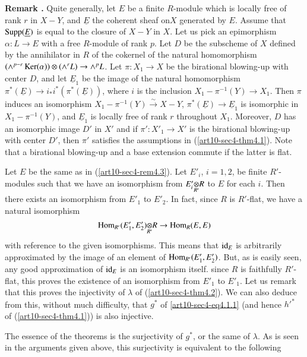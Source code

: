 \medskip
\noindent
{\bf Remark .\label{art10-sec4-rem4.3}}
Quite generally, let $E$ be a finite $R$-module which is locally free of rank $r$ in $X-Y$, and $\underline{E}$ the coherent sheaf on\pageoriginale $X$ generated by $E$. Assume that $\operatorname{\mathrm{Supp}}(\underline{E})$ is equal to the closure of $X-Y$ in $X$. Let us pick an epimorphism $\alpha:L\to E$ with a free $R$-module of rank $p$. Let $D$ be the subscheme of $X$ defined by the annihilator in $R$ of the cokernel of the natural homomorphism $(\wedge^{p-r}\operatorname{\mathrm{Ker}}(\alpha))\otimes (\wedge {}^{r}L)\to \wedge {}^{p}L$. Let $\pi:X_{1}\to X$ be the birational blowing-up with center $D$, and let $\underline{E}_{1}$ be the image of the natural homomorphism $\pi^{*}(\underline{E})\to i_{*}i^{*}(\pi^{*}(\underline{E}))$, where $i$ is the inclusion $X_{1}-\pi^{-1}(Y)\to X_{1}$. Then $\pi$ induces an isomorphism $X_{1}-\pi^{-1}(Y)\xrightarrow{\sim}X-Y$, $\pi^{*}(\underline{E})\to \underline{E}_{1}$ is isomorphic in $X_{1}-\pi^{-1}(Y)$, and $\underline{E}_{1}$ is locally free of rank $r$ throughout $X_{1}$. Moreover, $D$ has an isomorphic image $D'$ in $X'$ and if $\pi':X'_{1}\to X'$ is the birational blowing-up with center $D'$, then $\pi'$ satisfies the assumptions in (\ref{art10-sec4-thm4.1}). Note that a birational blowing-up and a base extension commute if the latter is flat.
\smallskip

Let $E$ be the same as in (\ref{art10-sec4-rem4.3}). Let $E'_{i}$, $i=1,2$, be finite $R'$-modules such that we have an isomorphism from $\foprod{E'_{i}}{R}{R'}$ to $E$ for each $i$. Then there exists an isomorphism from $E'_{1}$ to $E'_{2}$. In fact, since $R$ is $R'$-flat, we have a natural isomorphism
$$
\foprod{\Hom_{R'}(E'_{1},E'_{2})}{R}{R'}\to \Hom_{R}(E,E)
$$
with reference to the given isomorphisms. This means that $\operatorname{\mathrm{id}}_{E}$ is arbitrarily approximated by the image of an element of $\operatorname{\mathrm{Hom}}_{R'}(E'_{1},E'_{2})$. But, as is easily seen, any good approximation of $\operatorname{\mathrm{id}}_{E}$ is an isomorphism itself. since $R$ is faithfully $R'$-flat, this proves the existence of an isomorphism from $E'_{1}$ to $E'_{1}$. Let us remark that this proves the injectivity of $\lambda$ of (\ref{art10-sec4-thm4.2}). We can also deduce from this, without much difficulty, that $g^{*}$ of \eqref{art10-sec4-eq4.1.1} (and hence ${h'}^{*}$ of (\ref{art10-sec4-thm4.1})) is also injective.

The essence of the theorems is the surjectivity of $g^{*}$, or the same of $\lambda$. As is seen in the arguments given above, this surjectivity is equivalent to the following

